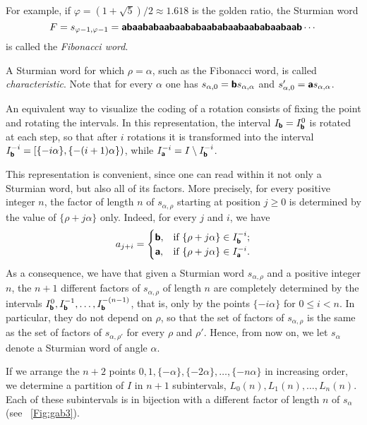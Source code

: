 \documentclass[11pt,reqno]{amsart}
\numberwithin{equation}{section}
\theoremstyle{plain}
\theoremstyle{definition}
\theoremstyle{remark}
\renewcommand{\phi}{\varphi}
\def\cd3#1{\textbf{\textsf{#1}}}
\def\sa#1{\cd3{#1}}
\begin{document}
For example, if $\phi=(1+\sqrt 5 )/2\approx 1.618$ is the golden ratio,  the Sturmian word $$F=s_{\phi-1,\phi-1}=\sa{abaababaabaababaababaabaababaabaab}\cdots$$ is called the \emph{Fibonacci word}. %

A Sturmian word for which $\rho=\alpha$, such as the Fibonacci word, is called \emph{characteristic}. Note that for every $\alpha$ one has $s_{\alpha,0}=\sa{b}s_{\alpha,\alpha}$ and $s'_{\alpha,0}=\sa{a}s_{\alpha,\alpha}$.

An equivalent way to visualize the coding of a rotation consists of fixing the point and rotating the intervals.  In this representation, the interval $I_{\sa{b}}=I_{\sa{b}}^{0}$ is rotated at each step, so that after $i$ rotations it is transformed into the interval $I_{\sa{b}}^{-i}=[\{-i\alpha\},\{-(i+1)\alpha\})$, while $I_{\sa{a}}^{-i}=I\setminus I_{\sa{b}}^{-i}$. 

This representation is convenient, since one can read within it not only a Sturmian word, but also all of its factors. More precisely, for every positive integer $n$, the factor of length $n$ of $s_{\alpha,\rho}$ starting at position $j\geq 0$ is determined by the value of $\{\rho+j\alpha\}$ only. Indeed, for every $j$ and $i$, we have
$$a_{j+i} = \begin{cases}
\sa{b},  & \text{if $\{\rho + j\alpha\}\in I_{\sa{b}}^{-i}$;}\\
\sa{a}, & \text{if $\{\rho + j\alpha\}\in I_{\sa{a}}^{-i}$.}
\end{cases}
$$
As a consequence, we have that given a Sturmian word $s_{\alpha,\rho}$ and  a positive integer $n$, the $n+1$ different factors of $s_{\alpha,\rho}$ of length $n$ are completely determined by the intervals $I_{\sa{b}}^{0}, I_{\sa{b}}^{-1},\ldots, I_{\sa{b}}^{-(n-1)}$, that is, only by the points $\{-i\alpha\}$ for $0\leq i< n$. In particular, they do not depend on $\rho$, so that the set of factors of $s_{\alpha,\rho}$ is the same as the set of factors of $s_{\alpha,\rho'}$ for every $\rho$ and $\rho'$.
Hence, from now on, we let $s_{\alpha}$ denote a Sturmian word of angle $\alpha$.

If we arrange the $n+2$ points $0,1,\{-\alpha\},\{-2\alpha\},\ldots,\{-n \alpha\}$ in increasing order, we determine a partition of $I$ in $n+1$ subintervals, $L_0(n),L_{1}(n),\ldots,L_{n}(n)$. Each of these subintervals is in bijection with a different factor of length $n$ of 
 $s_\alpha$ (see \figurename~\ref{Fig:gab3}). 
\end{document}
